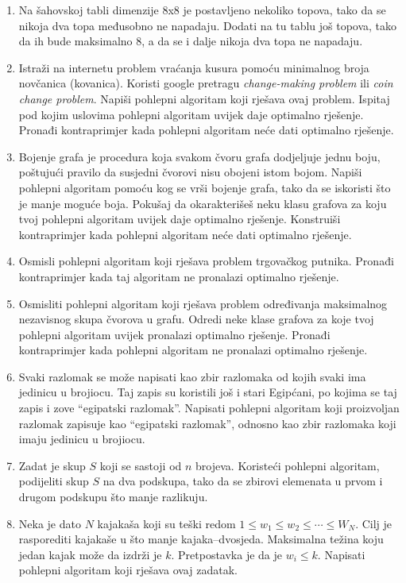 \documentclass[a4paper, utf8, 11pt, colorlinks]{book}
\begin{document}
\begin{enumerate}
	\item Na šahovskoj tabli dimenzije 8x8 je postavljeno nekoliko topova, tako da se nikoja dva topa međusobno ne napadaju. Dodati na tu tablu još topova, tako da ih bude maksimalno 8, a da se i dalje nikoja dva topa ne napadaju.
	\item Istraži na internetu problem vraćanja kusura pomoću minimalnog broja novčanica (kovanica). Koristi google pretragu \textit{change-making problem} ili \textit{coin change problem}. Napiši pohlepni algoritam koji rješava ovaj problem. Ispitaj pod kojim uslovima pohlepni algoritam uvijek daje optimalno rješenje. Pronađi kontraprimjer kada pohlepni algoritam neće dati optimalno rješenje.
	\item Bojenje grafa je procedura koja svakom čvoru grafa dodjeljuje jednu boju, poštujući pravilo da susjedni čvorovi nisu obojeni istom bojom. Napiši pohlepni algoritam pomoću kog se vrši bojenje grafa, tako da se iskoristi što je manje moguće boja. Pokušaj da okarakterišeš neku klasu grafova za koju tvoj pohlepni algoritam uvijek daje optimalno rješenje. Konstruiši kontraprimjer kada pohlepni algoritam neće dati optimalno rješenje.
	
	\item Osmisli pohlepni algoritam koji rješava problem trgovačkog putnika. Pronađi kontraprimjer kada taj algoritam ne pronalazi optimalno rješenje.
	
	\item Osmisliti pohlepni algoritam koji rješava problem određivanja maksimalnog nezavisnog skupa čvorova u grafu. Odredi neke klase grafova za koje tvoj pohlepni algoritam uvijek pronalazi optimalno rješenje. Pronađi kontraprimjer kada pohlepni algoritam ne pronalazi optimalno rješenje.
	
	\item Svaki razlomak se može napisati kao zbir razlomaka od kojih svaki ima jedinicu u brojiocu. Taj zapis su koristili još i stari Egipćani, po kojima se taj zapis i zove ``egipatski razlomak''. 
	Napisati pohlepni algoritam koji proizvoljan razlomak zapisuje kao ``egipatski razlomak'', odnosno kao zbir razlomaka koji imaju jedinicu u brojiocu.
	
	\item Zadat je skup $S$ koji se sastoji od $n$ brojeva. Koristeći pohlepni algoritam, podijeliti skup $S$ na dva podskupa, tako da se zbirovi elemenata u prvom i drugom podskupu što manje razlikuju.
	
	\item Neka je dato $N$ kajakaša koji su teški redom $1\leqslant w_1\leqslant w_2\leqslant \cdots \leqslant W_N$. Cilj je rasporediti kajakaše u što manje kajaka--dvosjeda. Maksimalna težina koju jedan kajak može da izdrži je $k$. Pretpostavka je da je $w_i\leqslant k$. Napisati pohlepni algoritam koji rješava ovaj zadatak.
	

\end{enumerate}
\end{document}
